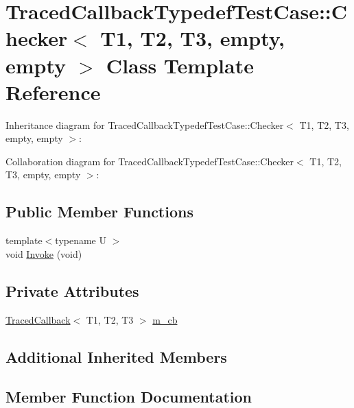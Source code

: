 \hypertarget{classTracedCallbackTypedefTestCase_1_1Checker_3_01T1_00_01T2_00_01T3_00_01empty_00_01empty_01_4}{}\section{Traced\+Callback\+Typedef\+Test\+Case\+:\+:Checker$<$ T1, T2, T3, empty, empty $>$ Class Template Reference}
\label{classTracedCallbackTypedefTestCase_1_1Checker_3_01T1_00_01T2_00_01T3_00_01empty_00_01empty_01_4}


Inheritance diagram for Traced\+Callback\+Typedef\+Test\+Case\+:\+:Checker$<$ T1, T2, T3, empty, empty $>$\+:


Collaboration diagram for Traced\+Callback\+Typedef\+Test\+Case\+:\+:Checker$<$ T1, T2, T3, empty, empty $>$\+:
\subsection*{Public Member Functions}
\begin{DoxyCompactItemize}
\item 
{\footnotesize template$<$typename U $>$ }\\void \hyperlink{classTracedCallbackTypedefTestCase_1_1Checker_3_01T1_00_01T2_00_01T3_00_01empty_00_01empty_01_4_a3e6a2c19aa4ec03b8411314e8474b0c3}{Invoke} (void)
\end{DoxyCompactItemize}
\subsection*{Private Attributes}
\begin{DoxyCompactItemize}
\item 
\hyperlink{classns3_1_1TracedCallback}{Traced\+Callback}$<$ T1, T2, T3 $>$ \hyperlink{classTracedCallbackTypedefTestCase_1_1Checker_3_01T1_00_01T2_00_01T3_00_01empty_00_01empty_01_4_a6957bc73e64106ed1a8716e6e553aeec}{m\+\_\+cb}
\end{DoxyCompactItemize}
\subsection*{Additional Inherited Members}


\subsection{Member Function Documentation}

